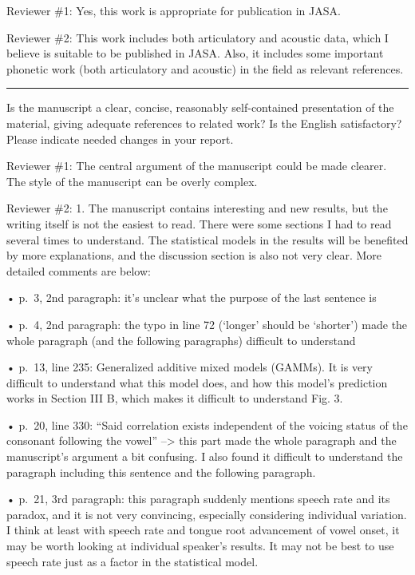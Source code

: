 \documentclass[]{article}
\begin{document}
Reviewer \#1: Yes, this work is appropriate for publication in JASA.

Reviewer \#2: This work includes both articulatory and acoustic data,
which I believe is suitable to be published in JASA. Also, it includes
some important phonetic work (both articulatory and acoustic) in the
field as relevant references.

\par

\noindent

\rule{\textwidth}{0.4pt}

Is the manuscript a clear, concise, reasonably self-contained
presentation of the material, giving adequate references to related
work? Is the English satisfactory? Please indicate needed changes in
your report.

Reviewer \#1: The central argument of the manuscript could be made
clearer. The style of the manuscript can be overly complex.

Reviewer \#2: 1. The manuscript contains interesting and new results,
but the writing itself is not the easiest to read. There were some
sections I had to read several times to understand. The statistical
models in the results will be benefited by more explanations, and the
discussion section is also not very clear. More detailed comments are
below:

• p.~3, 2nd paragraph: it's unclear what the purpose of the last
sentence is

• p.~4, 2nd paragraph: the typo in line 72 (`longer' should be
`shorter') made the whole paragraph (and the following paragraphs)
difficult to understand

• p.~13, line 235: Generalized additive mixed models (GAMMs). It is very
difficult to understand what this model does, and how this model's
prediction works in Section III B, which makes it difficult to
understand Fig. 3.

• p.~20, line 330: ``Said correlation exists independent of the voicing
status of the consonant following the vowel'' --\textgreater{} this part
made the whole paragraph and the manuscript's argument a bit confusing.
I also found it difficult to understand the paragraph including this
sentence and the following paragraph.

• p.~21, 3rd paragraph: this paragraph suddenly mentions speech rate and
its paradox, and it is not very convincing, especially considering
individual variation. I think at least with speech rate and tongue root
advancement of vowel onset, it may be worth looking at individual
speaker's results. It may not be best to use speech rate just as a
factor in the statistical model.
\end{document}
